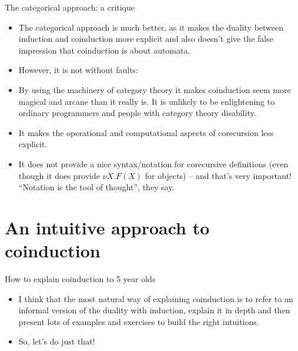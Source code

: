 \documentclass{beamer}
\begin{document}
\begin{frame}{The categorical approach: a critique}
\begin{itemize}
	\item The categorical approach is much better, as it makes the duality between induction and coinduction more explicit and also doesn't give the false impression that coinduction is about automata.
	\item However, it is not without faults:
	\item By using the machinery of category theory it makes coinduction seem more magical and arcane than it really is. It is unlikely to be enlightening to ordinary programmers and people with category theory disability.
	\item It makes the operational and computational aspects of corecursion less explicit.
	\item It does not provide a nice syntax/notation for corecursive definitions (even though it does provide $\nu X. F(X)$ for objects) -- and that's very important! ``Notation is the tool of thought'', they say.
\end{itemize}
\end{frame}

\section{An intuitive approach to coinduction}

\begin{frame}{How to explain coinduction to 5 year olds}
\begin{itemize}
	\item I think that the most natural way of explaining coinduction is to refer to an informal version of the duality with induction, explain it in depth and then present lots of examples and exercises to build the right intuitions.
	\item So, let's do just that! 
\end{itemize}
\end{frame}
\end{document}
